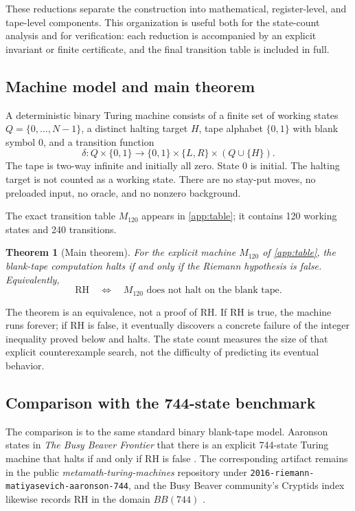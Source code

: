 \documentclass[10pt]{article}
\newtheorem{theorem}{Theorem}[section]
\theoremstyle{definition}
\newcommand{\RH}{\mathrm{RH}}
\begin{document}
These reductions separate the construction into mathematical, register-level,
and tape-level components. This organization is useful both for the
state-count analysis and for verification: each reduction is accompanied by an
explicit invariant or finite certificate, and the final transition table is
included in full.

\subsection{Machine model and main theorem}

A deterministic binary Turing machine consists of a finite set of working
states $Q=\{0,\ldots,N-1\}$, a distinct halting target $H$, tape alphabet
$\{0,1\}$ with blank symbol $0$, and a transition function
\[
\delta:Q\times\{0,1\}\longrightarrow \{0,1\}\times\{L,R\}\times(Q\cup\{H\}).
\]
The tape is two-way infinite and initially all zero. State $0$ is initial. The
halting target is not counted as a working state. There are no stay-put moves,
no preloaded input, no oracle, and no nonzero background.

The exact transition table $M_{120}$ appears in \cref{app:table}; it contains
120 working states and 240 transitions.

\begin{theorem}[Main theorem]
\label{thm:main}
For the explicit machine $M_{120}$ of \cref{app:table}, the blank-tape
computation halts if and only if the Riemann hypothesis is false.
Equivalently,
\[
\RH\quad\Longleftrightarrow\quad M_{120}\text{ does not halt on the blank tape}.
\]
\end{theorem}

The theorem is an equivalence, not a proof of RH. If RH is true, the machine
runs forever; if RH is false, it eventually discovers a concrete failure of
the integer inequality proved below and halts. The state count measures the
size of that explicit counterexample search, not the difficulty of predicting its
eventual behavior.

\subsection{Comparison with the 744-state benchmark}
\label{sec:record}

The comparison is to the same standard binary blank-tape model. Aaronson
states in \emph{The Busy Beaver Frontier} that there is an explicit 744-state
Turing machine that halts if and only if RH is false \cite{Aaronson}. The
corresponding artifact remains in the public \emph{metamath-turing-machines}
repository under \texttt{2016-riemann-matiyasevich-aaronson-744}, and the Busy
Beaver community's Cryptids index likewise records RH in the domain $BB(744)$
\cite{RH744Repo,BBCryptids}.
\end{document}
